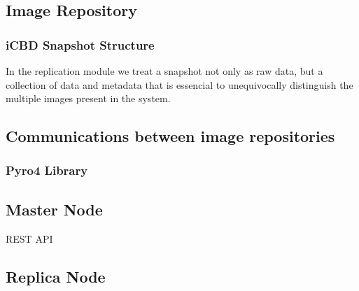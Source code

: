 \subsection{Image Repository}
\label{sub:rep_image_repo}

\subsubsection{iCBD Snapshot Structure}
\label{subsub:icbd_snapshot}

In the replication module we treat a snapshot not only as raw data, but a collection of data and metadata that is essencial to unequivocally distinguish the multiple images present in the system. 


\subsection{Communications between image repositories}
\label{sub:rep_rpcs}


\subsubsection{Pyro4 Library}
\label{subsub:rep_pyro4}



\subsection{Master Node}
\label{sub:rep_master_node}

REST API

\subsection{Replica Node}
\label{sub:rep_replica_node}






